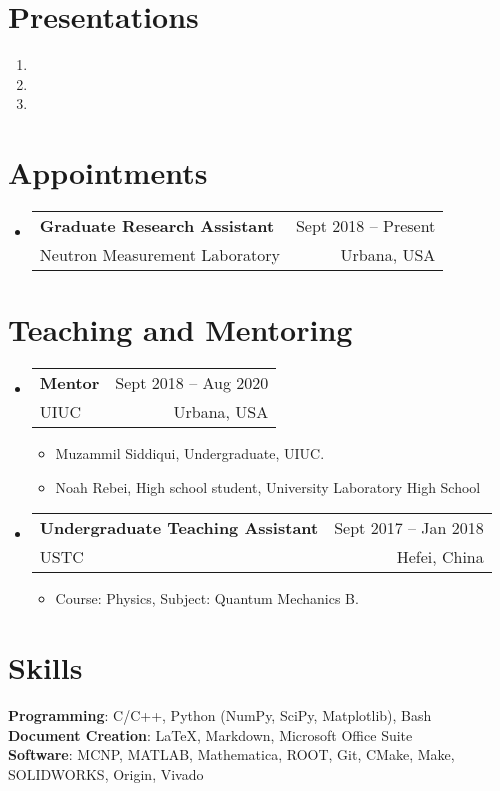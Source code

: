 \documentclass[letterpaper,11pt]{article} %
\makeatletter
\newcommand{\CVItem}[1]{
  \item\small{
    {#1 \vspace{-2pt}}
  }
}
\newcommand{\CVSubheading}[4]{
  \vspace{-2pt}\item
    \begin{tabular*}{0.97\textwidth}[t]{l@{\extracolsep{\fill}}r}
      \textbf{#1} & #2 \\
      \small#3 & \small #4 \\
    \end{tabular*}\vspace{-7pt}
}
\newcommand{\CVSubHeadingListStart}{\begin{itemize}[leftmargin=0.5cm, label={}]}
\newcommand{\CVSubHeadingListEnd}{\end{itemize}}
\newcommand{\CVItemListStart}{\begin{itemize}}
\newcommand{\CVItemListEnd}{\end{itemize}\vspace{-5pt}}
\makeatother
\begin{document}
\section{Presentations}
    \begin{enumerate}
        \item {}
        \item {}
        \item {}
    \end{enumerate}
 
\begin{comment}
Section is here as it applied to my application for positions in academia. 
Remember to tailor the resume for to the position.
\end{comment}
\section{Appointments}
\CVSubHeadingListStart
    \CVSubheading
      {Graduate Research Assistant}{Sept 2018 – Present}
      {Neutron Measurement Laboratory}{Urbana, USA}
  \CVSubHeadingListEnd

\section{Teaching and Mentoring}
\CVSubHeadingListStart
    \CVSubheading
      {Mentor}{Sept 2018 – Aug 2020}
      {UIUC}{Urbana, USA}
      \CVItemListStart
        \CVItem{Muzammil Siddiqui, Undergraduate, UIUC.}
        \CVItem{Noah Rebei, High school student, University Laboratory High School}
      \CVItemListEnd
    \CVSubheading
      {Undergraduate Teaching Assistant}{Sept 2017 – Jan 2018}
      {USTC}{Hefei, China}
      \CVItemListStart
        \CVItem{Course: Physics, Subject: Quantum Mechanics B.}
      \CVItemListEnd
  \CVSubHeadingListEnd

\begin{comment}
This section is compressed from the various skills sections that Euro CV
recommends.
\end{comment}

\section{Skills}
 \begin{itemize}[leftmargin=0.5cm, label={}]
    \small{\item{
     \textbf{Programming}{: C/C++, Python (NumPy, SciPy, Matplotlib), Bash} \\
     \textbf{Document Creation}{: \LaTeX, Markdown, Microsoft Office Suite} \\
     \textbf{Software}{: MCNP, MATLAB, Mathematica, ROOT, Git, CMake, Make, SOLIDWORKS, Origin, Vivado}\\
    }}
 \end{itemize}
\end{document}
